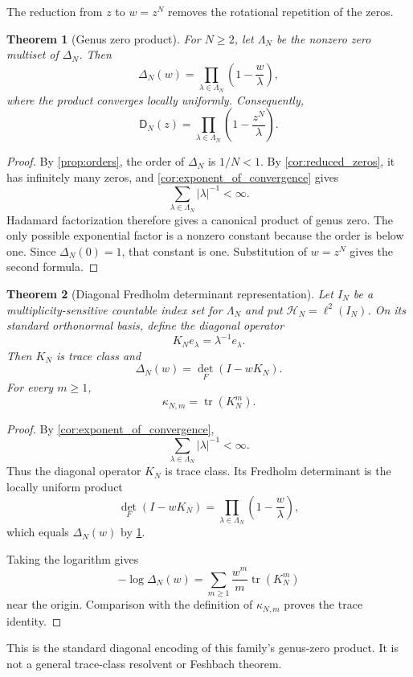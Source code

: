 \documentclass[11pt]{article}
\newtheorem{theorem}{Theorem}[section]
\theoremstyle{definition}
\theoremstyle{remark}
\newcommand{\Dfun}{\mathsf D}
\newcommand{\tr}{\operatorname{tr}}
\newcommand{\Fdet}{\operatorname{det}_{\!F}}
\begin{document}
The reduction from $z$ to $w=z^N$ removes the rotational repetition of the zeros.

\begin{theorem}[Genus zero product]\label{thm:genus_zero_product}
For $N\geq2$, let $\Lambda_N$ be the nonzero zero multiset of $\Delta_N$.  Then
\[
\Delta_N(w)
=
\prod_{\lambda\in\Lambda_N}
\left(1-\frac w\lambda\right),
\]
where the product converges locally uniformly.  Consequently,
\[
\Dfun_N(z)
=
\prod_{\lambda\in\Lambda_N}
\left(1-\frac{z^N}{\lambda}\right).
\]
\end{theorem}

\begin{proof}
By \cref{prop:orders}, the order of $\Delta_N$ is $1/N<1$.  By
\cref{cor:reduced_zeros}, it has infinitely many zeros, and
\cref{cor:exponent_of_convergence} gives
\[
\sum_{\lambda\in\Lambda_N}|\lambda|^{-1}<\infty.
\]
Hadamard factorization therefore gives a canonical product of genus zero.
The only possible exponential factor is a nonzero constant because the order
is below one.  Since $\Delta_N(0)=1$, that constant is one.  Substitution of
$w=z^N$ gives the second formula.
\end{proof}


\begin{theorem}[Diagonal Fredholm determinant representation]\label{thm:trace_class_model}
Let $I_N$ be a multiplicity-sensitive countable index set for $\Lambda_N$
and put $\mathcal H_N=\ell^2(I_N)$.  On its standard orthonormal basis,
define the diagonal operator
\[
K_Ne_\lambda=\lambda^{-1}e_\lambda.
\]
Then $K_N$ is trace class and
\[
\Delta_N(w)=\Fdet(I-wK_N).
\]
For every $m\geq1$,
\[
\kappa_{N,m}=\tr(K_N^m).
\]
\end{theorem}

\begin{proof}
By \cref{cor:exponent_of_convergence},
\[
\sum_{\lambda\in\Lambda_N}|\lambda|^{-1}<\infty.
\]
Thus the diagonal operator $K_N$ is trace class.  Its Fredholm determinant is the locally uniform product
\[
\Fdet(I-wK_N)
=
\prod_{\lambda\in\Lambda_N}
\left(1-\frac w\lambda\right),
\]
which equals $\Delta_N(w)$ by \cref{thm:genus_zero_product}.

Taking the logarithm gives
\[
-\log\Delta_N(w)
=
\sum_{m\geq1}\frac{w^m}{m}\tr(K_N^m)
\]
near the origin.  Comparison with the definition of $\kappa_{N,m}$ proves the trace identity.
\end{proof}

This is the standard diagonal encoding of this family's genus-zero product.
It is not a general trace-class resolvent or Feshbach theorem.
\end{document}
